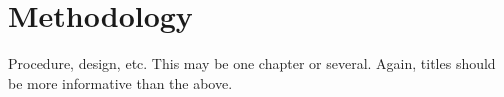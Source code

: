 \documentclass[main]{subfiles}
\begin{document}
\chapter{Methodology}

Procedure, design, etc. This may be one chapter or several.  Again, titles should be more
informative than the above.
\end{document}
